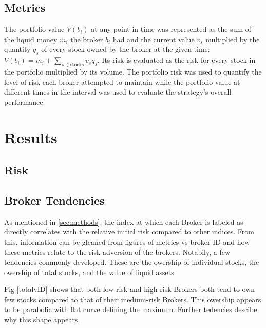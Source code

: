 \documentclass[letterpaper, 10 pt, proceedings]{ieeetran}
\begin{document}
	\subsection{Metrics}\label{subsec:metrics}	
	The portfolio value $V(b_i)$ at any point in time was represented as the sum of the liquid money $m_i$ the broker $b_i$ had and the current value $v_s$ multiplied by the quantity $q_s$ of every stock owned by the broker at the given time: $V(b_i) = m_i + \sum\limits_{s\in\text{stocks}} v_s q_s$. Its risk is evaluated as the risk for every stock in the portfolio multiplied by its volume. The portfolio risk was used to quantify the level of risk each broker attempted to maintain while the portfolio value at different times in the interval was used to evaluate the strategy's overall performance.


	\section{Results}\label{sec:results}
	
	\subsection{Risk}
	
	\subsection{Broker Tendencies}\label{subsec:tendencies}	
	As mentioned in \ref{sec:methods}, the index at which each Broker is labeled as directly correlates with the relative initial risk compared to other indices. From this, information can be gleaned from figures of metrics vs broker ID and how these metrics relate to the risk adversion of the brokers. Notabily, a few tendencies commonly developed. These are the owership of individual stocks, the owership of total stocks, and the value of liquid assets.\par
	Fig \ref{totalvID} shows that both low risk and high risk Brokers both tend to own few stocks compared to that of their medium-risk Brokers. This owership appears to be parabolic with flat curve defining the maximum. Further tedencies descibe why this shape appears. \par
\end{document}
